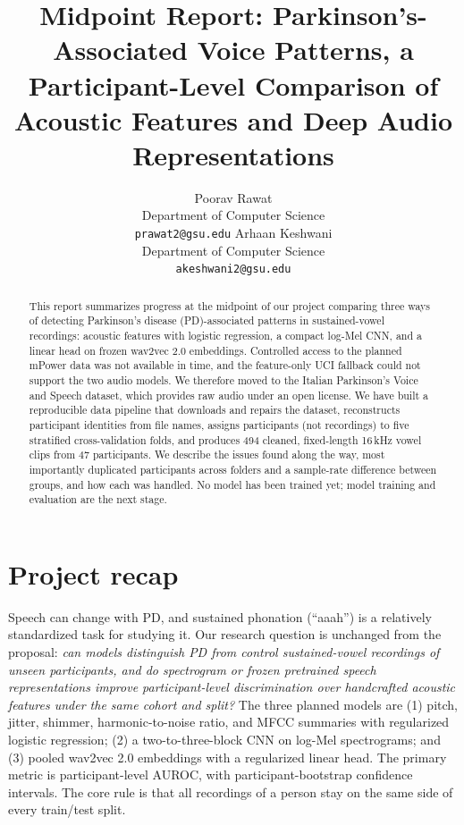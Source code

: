 \documentclass{article}
\title{Midpoint Report: Parkinson's-Associated Voice Patterns, a Participant-Level Comparison of Acoustic Features and Deep Audio Representations}
\author{
  Poorav Rawat \\
  Department of Computer Science \\
  \texttt{prawat2@gsu.edu}
  \And
  Arhaan Keshwani \\
  Department of Computer Science \\
  \texttt{akeshwani2@gsu.edu}
}
\begin{document}
\maketitle

\begin{abstract}
This report summarizes progress at the midpoint of our project comparing three ways of detecting Parkinson's disease (PD)-associated patterns in sustained-vowel recordings: acoustic features with logistic regression, a compact log-Mel CNN, and a linear head on frozen wav2vec 2.0 embeddings. Controlled access to the planned mPower data was not available in time, and the feature-only UCI fallback could not support the two audio models. We therefore moved to the Italian Parkinson's Voice and Speech dataset, which provides raw audio under an open license. We have built a reproducible data pipeline that downloads and repairs the dataset, reconstructs participant identities from file names, assigns participants (not recordings) to five stratified cross-validation folds, and produces 494 cleaned, fixed-length 16\,kHz vowel clips from 47 participants. We describe the issues found along the way, most importantly duplicated participants across folders and a sample-rate difference between groups, and how each was handled. No model has been trained yet; model training and evaluation are the next stage.
\end{abstract}

\section{Project recap}
Speech can change with PD, and sustained phonation (``aaah'') is a relatively standardized task for studying it. Our research question is unchanged from the proposal: \emph{can models distinguish PD from control sustained-vowel recordings of unseen participants, and do spectrogram or frozen pretrained speech representations improve participant-level discrimination over handcrafted acoustic features under the same cohort and split?} The three planned models are (1) pitch, jitter, shimmer, harmonic-to-noise ratio, and MFCC summaries with regularized logistic regression; (2) a two-to-three-block CNN on log-Mel spectrograms; and (3) pooled wav2vec 2.0 embeddings \citep{baevski2020} with a regularized linear head. The primary metric is participant-level AUROC, with participant-bootstrap confidence intervals. The core rule is that all recordings of a person stay on the same side of every train/test split.
\end{document}
